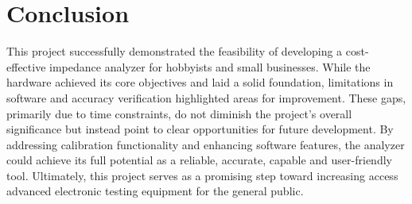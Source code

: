 \chapter{Conclusion} \label{ch:Conclusion}
This project successfully demonstrated the feasibility of developing a cost-effective impedance analyzer for hobbyists and small businesses. While the hardware achieved its core objectives and laid a solid foundation, limitations in software and accuracy verification highlighted areas for improvement. These gaps, primarily due to time constraints, do not diminish the project's overall significance but instead point to clear opportunities for future development. By addressing calibration functionality and enhancing software features, the analyzer could achieve its full potential as a reliable, accurate, capable and user-friendly tool. Ultimately, this project serves as a promising step toward increasing access advanced electronic testing equipment for the general public.